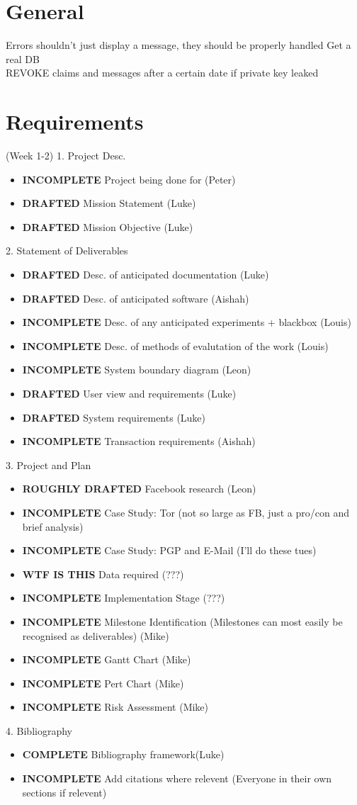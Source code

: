 \section{General}
Errors shouldn't just display a message, they should be properly handled
Get a real DB\\
REVOKE claims and messages after a certain date if private key leaked\\

\section{Requirements} (Week 1-2)
1. Project Desc.
\begin{itemize}
\item \textbf{INCOMPLETE} Project being done for (Peter)
\item \textbf{DRAFTED} Mission Statement (Luke)
\item \textbf{DRAFTED} Mission Objective (Luke)
\end{itemize}

2. Statement of Deliverables
\begin{itemize}
\item \textbf{DRAFTED} Desc. of anticipated documentation (Luke)
\item \textbf{DRAFTED} Desc. of anticipated software (Aishah)
\item \textbf{INCOMPLETE} Desc. of any anticipated experiments + blackbox (Louis)
\item \textbf{INCOMPLETE} Desc. of methods of evalutation of the work (Louis)
\item \textbf{INCOMPLETE} System boundary diagram (Leon)
\item \textbf{DRAFTED} User view and requirements (Luke)
\item \textbf{DRAFTED} System requirements (Luke)
\item \textbf{INCOMPLETE} Transaction requirements (Aishah)
\end{itemize}

3. Project and Plan
\begin{itemize}
\item \textbf{ROUGHLY DRAFTED} Facebook research (Leon)
\item \textbf{INCOMPLETE} Case Study: Tor (not so large as FB, just a pro/con and brief analysis)
\item \textbf{INCOMPLETE} Case Study: PGP and E-Mail (I'll do these tues)
\item \textbf{WTF IS THIS} Data required (???)
\item \textbf{INCOMPLETE} Implementation Stage (???)
\item \textbf{INCOMPLETE} Milestone Identification (Milestones can most easily be recognised as deliverables) (Mike)
\item \textbf{INCOMPLETE} Gantt Chart (Mike)
\item \textbf{INCOMPLETE} Pert Chart (Mike)
\item \textbf{INCOMPLETE} Risk Assessment (Mike)
\end{itemize}

4. Bibliography
\begin{itemize}
\item \textbf{COMPLETE} Bibliography framework(Luke)
\item \textbf{INCOMPLETE} Add citations where relevent (Everyone in their own sections if relevent)
\end{itemize}

